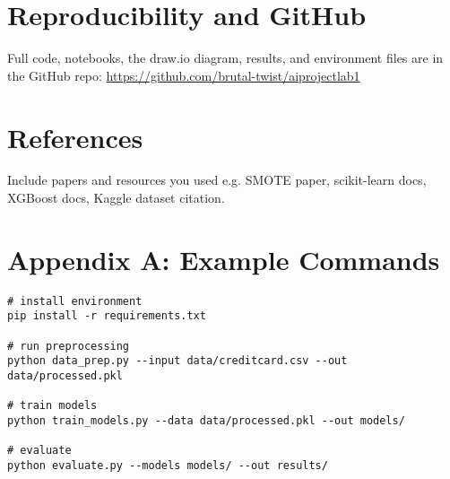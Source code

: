 \documentclass[12pt,a4paper]{article}
\begin{document}
\section{Reproducibility and GitHub}
Full code, notebooks, the draw.io diagram, results, and environment files are in the GitHub repo: \url{https://github.com/brutal-twist/aiprojectlab1}

\section{References}
Include papers and resources you used e.g. SMOTE paper, scikit-learn docs, XGBoost docs, Kaggle dataset citation.

\appendix
\section{Appendix A: Example Commands}
\begin{verbatim}
# install environment
pip install -r requirements.txt

# run preprocessing
python data_prep.py --input data/creditcard.csv --out data/processed.pkl

# train models
python train_models.py --data data/processed.pkl --out models/

# evaluate
python evaluate.py --models models/ --out results/
\end{verbatim}
\end{document}
